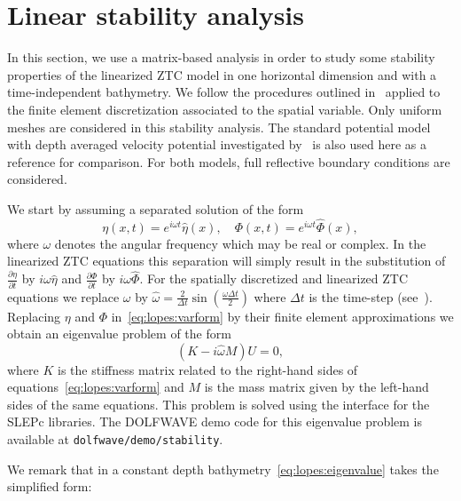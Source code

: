 
\section{Linear stability analysis}\label{sec:lopes:linearanalysis}
In this section, we use a matrix-based analysis in order to
study some stability properties of the linearized ZTC model
in one horizontal dimension and with a time-independent
bathymetry. We follow the procedures outlined
in~\citet{LovholtPedersen2009} applied to the finite element
discretization associated to the spatial variable.  Only
uniform meshes are considered in this stability analysis.
The standard potential model with depth averaged velocity
potential investigated by~\citet{LovholtPedersen2009} is also
used here as a reference for comparison.  For both models,
full reflective boundary conditions are considered.

We start by assuming  a separated  solution of the form
\begin{equation}\label{eq:lopes:exp}
\eta(x,t)=e^{i\omega t}\hat\eta(x),\quad
\Phi(x,t)=e^{i\omega t}\hat\Phi(x),
\end{equation}
where  $\omega$ denotes the  angular frequency which
may be real or complex.
In the linearized ZTC equations this separation will simply
result in the substitution of $\frac{\partial \eta}{\partial
t}$ by $i\omega \hat\eta$ and $\frac{\partial \Phi}{\partial
t}$ by $i\omega \hat\Phi$.
For the spatially discretized and linearized ZTC equations
we replace $\omega$ by $\hat\omega=\frac{2}{\Delta
t}\sin\left(\frac{\omega \Delta t}{2}\right)$ where $\Delta
t$ is the time-step (see~\citet{LovholtPedersen2009}).
Replacing $\eta$ and $\Phi$ in~\eqref{eq:lopes:varform} by
their finite element approximations
 we obtain an eigenvalue problem of the form
\begin{equation}\label{eq:lopes:eigenvalue}
(K- i\hat\omega M) U=0,
\end{equation}
where $K$ is the stiffness matrix related to the right-hand
sides of equations~\eqref{eq:lopes:varform} and $M$ is the mass
matrix given by the left-hand sides of the same equations.
This problem is solved using the \dolfin interface for the
SLEPc libraries.  The DOLFWAVE demo code for this eigenvalue problem
is available at {\tt dolfwave/demo/stability}.

We remark that in  a constant depth
bathymetry~\eqref{eq:lopes:eigenvalue}
takes the simplified form:

